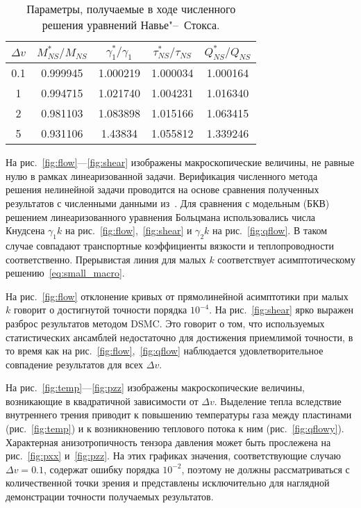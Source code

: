 \documentclass[a4paper,12pt]{article}
\newcommand{\NS}{N\!S}
\begin{document}
\begin{table}
    \centering
    \begin{tabular}{|c|c|c|c|c|}
        \hline
        \(\Delta{v}\) & \(M_{\NS}^*/M_{\NS}\) & \(\gamma_1^*/\gamma_1\) &
            \(\tau_{\NS}^*/\tau_{\NS}\) & \(Q_{\NS}^*/Q_{\NS}\) \\ \hline
        0.1 & 0.999945 & 1.000219 & 1.000034 & 1.000164 \\ \hline
          1 & 0.994715 & 1.021740 & 1.004231 & 1.016340 \\ \hline
          2 & 0.981103 & 1.083898 & 1.015166 & 1.063415 \\ \hline
          5 & 0.931106 & 1.43834  & 1.055812 & 1.339246 \\ \hline
    \end{tabular}
    \caption{Параметры, получаемые в ходе численного решения уравнений Навье"--~Стокса.}
    \label{table:NS_params}
\end{table}

На рис.~\ref{fig:flow}---\ref{fig:shear} изображены макроскопические величины,
не равные нулю в рамках линеаризованной задачи.
Верификация численного метода решения нелинейной задачи проводится на основе сравнения
полученных результатов с численными данными из~\cite{Sone1990}.
Для сравнения с модельным (БКВ) решением линеаризованного уравнения Больцмана
использовались числа Кнудсена \(\gamma_1k\) на рис.~\ref{fig:flow},~\ref{fig:shear} и
\(\gamma_2k\) на рис.~\ref{fig:qflow}. В таком случае совпадают транспортные коэффициенты
вязкости и теплопроводности соответственно. Прерывистая линия для малых \(k\) соответствует
асимптотическому решению~\eqref{eq:small_macro}.

На рис.~\ref{fig:flow} отклонение кривых от прямолинейной асимптотики при малых \(k\)
говорит о достигнутой точности порядка \(10^{-4}\).
На рис.~\ref{fig:shear} ярко выражен разброс результатов методом DSMC.
Это говорит о том, что используемых статистических ансамблей недостаточно для
достижения приемлимой точности, в то время как на рис.~\ref{fig:flow},~\ref{fig:qflow}
наблюдается удовлетворительное совпадение результатов для всех \(\Delta{v}\).

На рис.~\ref{fig:temp}---\ref{fig:pzz} изображены макроскопические величины,
возникающие в квадратичной зависимости от \(\Delta{v}\).
Выделение тепла вследствие внутреннего трения приводит к повышению температуры газа
между пластинами (рис.~\ref{fig:temp}) и к возникновению теплового потока к ним (рис.~\ref{fig:qflowy}).
Характерная анизотропичность тензора давления может быть прослежена на рис.~\ref{fig:pxx} и~\ref{fig:pzz}.
На этих графиках значения, соответствующие случаю \(\Delta{v}=0.1\), содержат ошибку порядка \(10^{-2}\),
поэтому не должны рассматриваться с количественной точки зрения и представлены исключительно
для наглядной демонстрации точности получаемых результатов.
\end{document}
